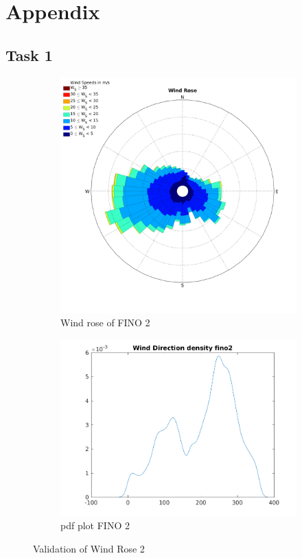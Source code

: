 \documentclass[10pt]{article}
\begin{document}
\section{Appendix}
\subsection{Task 1}
\begin{figure}[htb!]

\begin{subfigure}{0.5\textwidth}
  \centering
  \includegraphics[width=1\linewidth]{../figures/WindRose_Fino2.png}
  \caption{Wind rose of FINO 2}
\end{subfigure}
\begin{subfigure}{0.5\textwidth}
  \centering
  \includegraphics[width=1\linewidth]{../figures/Validation_WindRose_Fino2.png}
  \caption{pdf plot FINO 2}
\end{subfigure}
  \caption{Validation of Wind Rose 2}
\label{fig:WindroseValidation2}
\end{figure}
\end{document}
